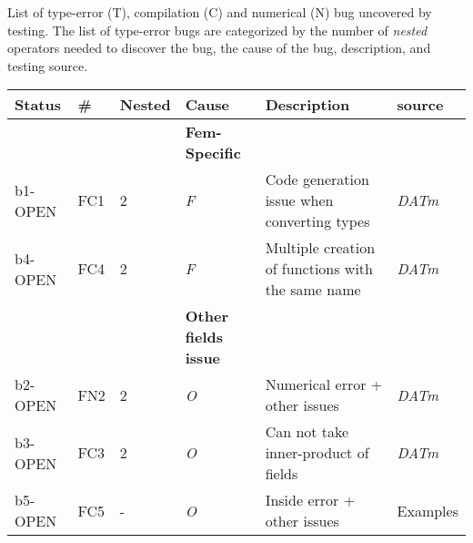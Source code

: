 \documentclass{article}
\newcommand{\fontit}[1]{\textit{#1}}
\newcommand{\checkname}[0]{\textit{DATm}}
\begin{document}
List of type-error (T), compilation (C) and numerical (N) bug uncovered by testing.
 The list of type-error bugs are categorized by the number of \fontit{nested} operators needed to discover the bug,  the cause of the bug, description, and testing source.
\newline 
\begin{tabular}{|l|llll|l|}
\hline
Status & \# &Nested & Cause & Description & source\\
\hline \hline &&&\textbf{Fem-Specific}&&\\
b1-OPEN &FC1 &2&\fontit{F}&Code generation issue when converting types&\checkname{}\\
b4-OPEN &FC4 &2&\fontit{F}&Multiple creation of functions with the same name &\checkname{}\\
&&&\textbf{Other fields issue}&&\\
b2-OPEN &FN2 &2&\fontit{O}&Numerical error + other issues&\checkname{}\\
b3-OPEN &FC3 &2&\fontit{O}& Can not take inner-product of fields&\checkname{} \\
b5-OPEN &FC5 &-&\fontit{O}& Inside error + other issues& Examples\\
\hline
\end{tabular}

\end{document}
